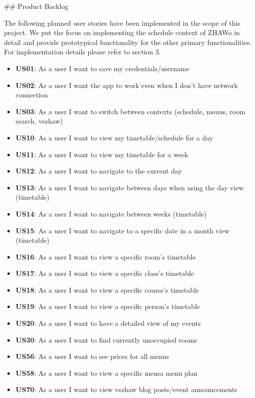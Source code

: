 \begin{markdown}
## Product Backlog


The following planned user stories have been implemented in the scope of this project. We put the focus on implementing the schedule context of ZHAWo in detail and provide prototypical functionality for the other primary functionalities. For implementation details please refer to section 3.

\begin{itemize}
  \item \textbf{US01}: As a user I want to save my credentials/username
  \item \textbf{US02}: As a user I want the app to work even when I don't have network connection
  \item \textbf{US03}: As a user I want to switch between contexts (schedule, menus, room search, vszhaw)
  \item \textbf{US10}: As a user I want to view my timetable/schedule for a day
  \item \textbf{US11}: As a user I want to view my timetable for a week
  \item \textbf{US12}: As a user I want to navigate to the current day
  \item \textbf{US13}: As a user I want to navigate between days when using the day view (timetable)
  \item \textbf{US14}: As a user I want to navigate between weeks (timetable)
  \item \textbf{US15}: As a user I want to navigate to a specific date in a month view (timetable)
  \item \textbf{US16}: As a user I want to view a specific room's timetable
  \item \textbf{US17}: As a user I want to view a specific class's timetable
  \item \textbf{US18}: As a user I want to view a specific course's timetable
  \item \textbf{US19}: As a user I want to view a specific person's timetable
  \item \textbf{US20}: As a user I want to have a detailed view of my events
  \item \textbf{US30}: As a user I want to find currently unoccupied rooms
  \item \textbf{US56}: As a user I want to see prices for all menus
  \item \textbf{US58}: As a user I want to view a specific mensa menu plan
  \item \textbf{US70}: As a user I want to view vszhaw blog posts/event announcements
\end{itemize}


\end{markdown}
